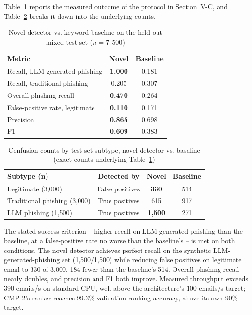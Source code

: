 \documentclass[conference]{IEEEtran}
\begin{document}
Table~\ref{tab:results} reports the measured outcome of the protocol in Section~V-C, and Table~\ref{tab:confusion} breaks it down into the underlying counts.

\begin{table}[t]
\centering
\caption{Novel detector vs. keyword baseline on the held-out mixed test set ($n=7{,}500$)}
\label{tab:results}
\begin{tabular}{@{}lcc@{}}
\toprule
\textbf{Metric} & \textbf{Novel} & \textbf{Baseline} \\
\midrule
Recall, LLM-generated phishing & \textbf{1.000} & 0.181 \\
Recall, traditional phishing & 0.205 & 0.307 \\
Overall phishing recall & \textbf{0.470} & 0.264 \\
False-positive rate, legitimate & \textbf{0.110} & 0.171 \\
Precision & \textbf{0.865} & 0.698 \\
F1 & \textbf{0.609} & 0.383 \\
\bottomrule
\end{tabular}
\end{table}

\begin{table}[t]
\centering
\caption{Confusion counts by test-set subtype, novel detector vs. baseline (exact counts underlying Table~\ref{tab:results})}
\label{tab:confusion}
\begin{tabular}{@{}lccc@{}}
\toprule
\textbf{Subtype (n)} & \textbf{Detected by} & \textbf{Novel} & \textbf{Baseline} \\
\midrule
Legitimate (3{,}000) & False positives & \textbf{330} & 514 \\
Traditional phishing (3{,}000) & True positives & 615 & 917 \\
LLM phishing (1{,}500) & True positives & \textbf{1{,}500} & 271 \\
\bottomrule
\end{tabular}
\end{table}

The stated success criterion -- higher recall on LLM-generated phishing than the baseline, at a false-positive rate no worse than the baseline's -- is met on both conditions. The novel detector achieves perfect recall on the synthetic LLM-generated-phishing set (1{,}500/1{,}500) while reducing false positives on legitimate email to 330 of 3{,}000, 184 fewer than the baseline's 514. Overall phishing recall nearly doubles, and precision and F1 both improve. Measured throughput exceeds 390 emails/s on standard CPU, well above the architecture's 100-emails/s target; CMP-2's ranker reaches 99.3\% validation ranking accuracy, above its own 90\% target.
\end{document}
